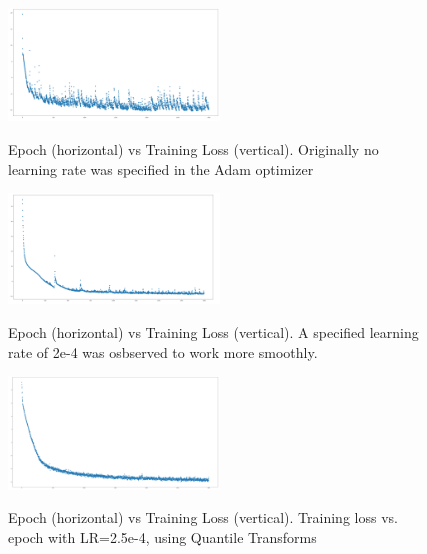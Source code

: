 \begin{figure}[htb]
\centering
\includegraphics[width = 0.5\textwidth]{Chapters/Ch3-Simulations/normalizing_flows/pics/MeetingFigures/Bobby/LearningRate/learning_rate_base_case.png}
\label{fig: jul8_pion_comparison2}
\caption[Placeholder Short text]{Epoch (horizontal) vs Training Loss (vertical). Originally no learning rate was specified in the Adam optimizer }
\end{figure}



\begin{figure}[htb]
\centering
\includegraphics[width = 0.5\textwidth]{Chapters/Ch3-Simulations/normalizing_flows/pics/MeetingFigures/Bobby/LearningRate/learning_rate_2e-4png.png}
\label{fig: jul8_pion_comparison3}
\caption[Placeholder Short text]{Epoch (horizontal) vs Training Loss (vertical). A specified learning rate of 2e-4 was osbserved to work more smoothly.}
\end{figure}



\begin{figure}[htb]
\centering
\includegraphics[width = 0.5\textwidth]{Chapters/Ch3-Simulations/normalizing_flows/pics/MeetingFigures/Bobby/LearningRate/learning_rate_25e-5_with_QT.png}
\label{fig: jul8_pion_comparison4}
\caption[Placeholder Short text]{Epoch (horizontal) vs Training Loss (vertical). Training loss vs. epoch with LR=2.5e-4, using Quantile Transforms }
\end{figure}




